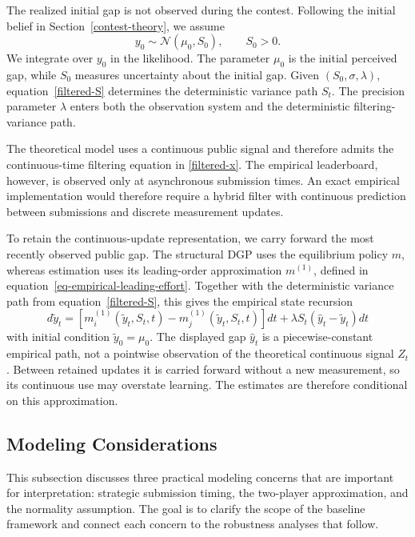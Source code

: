 \documentclass[mnsc]{informs3}
\begin{document}
{The realized initial gap is not observed during the contest. Following the initial belief in Section~\ref{contest-theory}, we assume}
\begin{equation}\label{eq-empirical-initial-state}
{y_0\sim\mathcal N\!\left(\mu_0,S_0\right),
\qquad S_0>0.}
\end{equation}
{We integrate over $y_0$ in the likelihood. The parameter $\mu_0$ is the initial perceived gap, while $S_0$ measures uncertainty about the initial gap. Given $(S_0,\sigma,\lambda)$, equation~\eqref{filtered-S} determines the deterministic variance path $S_t$.}
{The precision parameter $\lambda$ enters both the observation system and the deterministic filtering-variance path.}

The theoretical model uses a continuous public signal and therefore admits the continuous-time filtering equation in \eqref{filtered-x}. The empirical leaderboard, however, is observed only at asynchronous submission times. An exact empirical implementation would therefore require a hybrid filter with continuous prediction between submissions and discrete measurement updates.

{To retain the continuous-update representation, we carry forward the most recently observed public gap. The structural DGP uses the equilibrium policy $m$, whereas estimation uses its leading-order approximation $m^{(1)}$, defined in equation~\eqref{eq-empirical-leading-effort}. Together with the deterministic variance path from equation~\eqref{filtered-S}, this gives the empirical state recursion}
\begin{equation}\label{eq-filtered-y-update}
{d\tilde{y}_{t} = \left[m_i^{(1)}(\tilde{y}_t,S_t,t) - m_j^{(1)}(\tilde{y}_t,S_t,t)\right]dt + \lambda S_t(\hat{y}_t-\tilde{y}_{t}) dt}
\end{equation}
with initial condition $\tilde{y}_0 = \mu_0$.
The displayed gap $\hat y_t$ is a piecewise-constant empirical path, not a pointwise observation of the theoretical continuous signal $Z_t$. Between retained updates it is carried forward without a new measurement, so its continuous use may overstate learning. The estimates are therefore conditional on this approximation.

\subsection{Modeling Considerations}\label{sect-concerns}

This subsection discusses three practical modeling concerns that are important for interpretation: strategic submission timing, the two-player approximation, and the normality assumption.
The goal is to clarify the scope of the baseline framework and connect each concern to the robustness analyses that follow.
\end{document}
